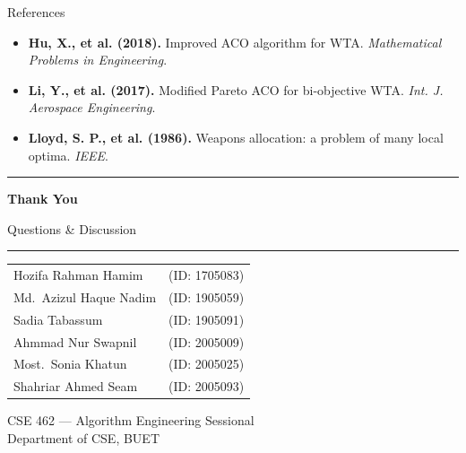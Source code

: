 \documentclass[aspectratio=169,10pt]{beamer}
\begin{document}
\begin{frame}[shrink=5]{References}
\begin{itemize}
    \item[\hypertarget{ref13}{[13]}] \textbf{Hu, X., et al. (2018).} Improved ACO algorithm for WTA. \textit{Mathematical Problems in Engineering}.
    \item[\hypertarget{ref14}{[14]}] \textbf{Li, Y., et al. (2017).} Modified Pareto ACO for bi-objective WTA. \textit{Int. J. Aerospace Engineering}.
    \item[\hypertarget{ref15}{[15]}] \textbf{Lloyd, S. P., et al. (1986).} Weapons allocation: a problem of many local optima. \textit{IEEE}.
  \end{itemize}
\end{frame}


{
\begin{frame}[plain]
  \begin{center}
    \vspace{1.2cm}

    {\color{goldaccent}\rule{0.25\textwidth}{2pt}}

    \vspace{0.5cm}
    {\color{white}\Huge\bfseries Thank You}

    \vspace{0.4cm}
    {\color{iceblue}\large Questions \& Discussion}

    \vspace{0.6cm}
    {\color{goldaccent}\rule{0.25\textwidth}{2pt}}

    \vspace{0.8cm}

    {\color{mygray}\small
      \begin{tabular}{l@{\quad}l}
        Hozifa Rahman Hamim      & (ID: 1705083) \\[3pt]
        Md.\ Azizul Haque Nadim  & (ID: 1905059) \\[3pt]
        Sadia Tabassum           & (ID: 1905091) \\[3pt]
        Ahmmad Nur Swapnil       & (ID: 2005009) \\[3pt]
        Most.\ Sonia Khatun      & (ID: 2005025) \\[3pt]
        Shahriar Ahmed Seam      & (ID: 2005093) \\
      \end{tabular}
    }

    \vspace{0.4cm}
    {\color{iceblue}\small
      CSE 462 --- Algorithm Engineering Sessional\\[2pt]
      Department of CSE, BUET
    }
  \end{center}
\end{frame}
}
\end{document}
